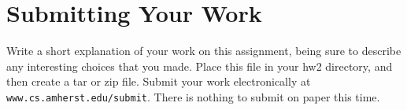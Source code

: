 \documentclass[11pt]{article}
\begin{document}
\section{Submitting Your Work}
Write a short explanation of your work on this assignment, being sure to describe any interesting choices that you made.  Place this file in your hw2 directory, and then create a tar or zip file.  Submit your work electronically at \verb'www.cs.amherst.edu/submit'.  There is nothing to submit on paper this time.
\end{document}
